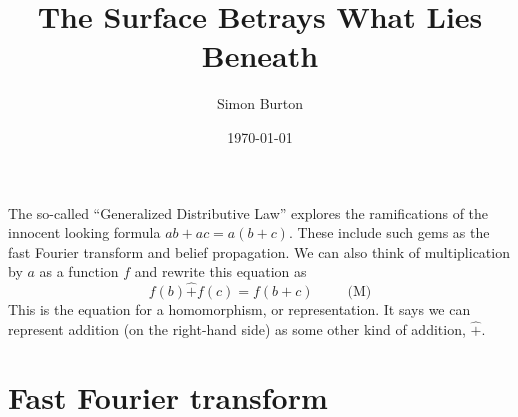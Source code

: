 \documentclass[12pt]{article}
\begin{document}
\title{The Surface Betrays What Lies Beneath}

\author{Simon Burton}

\date{\today}


\maketitle


\def\Complex{\mathbb{C}}
\def\Z{\mathbb{Z}}
\def\Ham{\mathcal{H}}
\def\Pauli{\mathcal{P}}
\def\Spec{\mbox{Spec}}
\def\Proveit{{\it (Proof??)}}
\def\GL{\mathrm{GL}}
\def\half{\frac{1}{2}}
\def\Stab{S}



%
%


The so-called ``Generalized Distributive Law''
\cite{Aji2000}
explores the ramifications of the innocent looking
formula $ab+ac = a(b+c).$
These include such gems as the fast Fourier transform
and belief propagation.
We can also think of multiplication by $a$ as a function $f$
and rewrite this equation as 
$$
    f(b)\hat{+}f(c)=f(b+c) \ \ \ \ \ \ \ \ \ \ \ \mbox{(M)}
$$
This is the equation for a homomorphism, or representation.
It says we can represent addition (on the right-hand side)
as some other kind of addition, $\hat{+}.$

\section{Fast Fourier transform}

\end{document}
